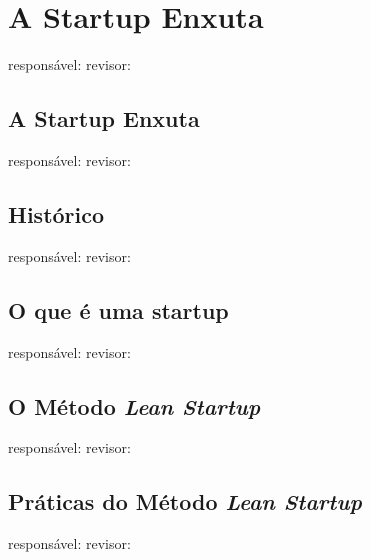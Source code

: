 \section{A Startup Enxuta}
responsável: revisor:

\subsection{A Startup Enxuta}
responsável: revisor:

\subsection{Histórico}
responsável: revisor:

\subsection{O que é uma startup}
responsável: revisor:

\subsection{O Método \emph{Lean Startup}}
responsável: revisor:

\subsection{Práticas do Método \emph{Lean Startup}}
responsável: revisor:

